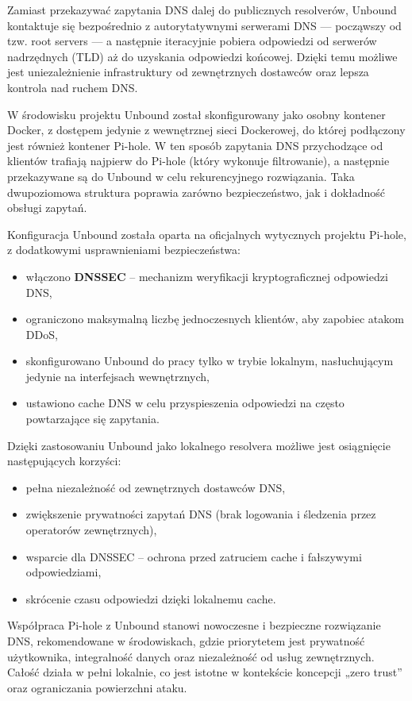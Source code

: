 \documentclass[
    left=2.5cm,         %
    right=2.5cm,        %
    top=2.5cm,          %
    bottom=3cm,         %
    bindingoffset=6mm,  %
    nohyphenation=true %
]{eiti/eiti-thesis} %
\begin{document}
Zamiast przekazywać zapytania DNS dalej do publicznych resolverów, Unbound kontaktuje się bezpośrednio z autorytatywnymi serwerami DNS — począwszy od tzw. root servers — a następnie iteracyjnie pobiera odpowiedzi od serwerów nadrzędnych (TLD) aż do uzyskania odpowiedzi końcowej. Dzięki temu możliwe jest uniezależnienie infrastruktury od zewnętrznych dostawców oraz lepsza kontrola nad ruchem DNS.

W środowisku projektu Unbound został skonfigurowany jako osobny kontener Docker, z dostępem jedynie z wewnętrznej sieci Dockerowej, do której podłączony jest również kontener Pi-hole\cite{config-unbound}. W ten sposób zapytania DNS przychodzące od klientów trafiają najpierw do Pi-hole (który wykonuje filtrowanie), a następnie przekazywane są do Unbound w celu rekurencyjnego rozwiązania. Taka dwupoziomowa struktura poprawia zarówno bezpieczeństwo, jak i dokładność obsługi zapytań.

Konfiguracja Unbound została oparta na oficjalnych wytycznych projektu Pi-hole, z dodatkowymi usprawnieniami bezpieczeństwa:
\begin{itemize}
    \item włączono \textbf{DNSSEC} – mechanizm weryfikacji kryptograficznej odpowiedzi DNS,
    \item ograniczono maksymalną liczbę jednoczesnych klientów, aby zapobiec atakom DDoS,
    \item skonfigurowano Unbound do pracy tylko w trybie lokalnym, nasłuchującym jedynie na interfejsach wewnętrznych,
    \item ustawiono cache DNS w celu przyspieszenia odpowiedzi na często powtarzające się zapytania.
\end{itemize}

Dzięki zastosowaniu Unbound jako lokalnego resolvera możliwe jest osiągnięcie następujących korzyści:
\begin{itemize}
    \item pełna niezależność od zewnętrznych dostawców DNS,
    \item zwiększenie prywatności zapytań DNS (brak logowania i śledzenia przez operatorów zewnętrznych),
    \item wsparcie dla DNSSEC – ochrona przed zatruciem cache i fałszywymi odpowiedziami,
    \item skrócenie czasu odpowiedzi dzięki lokalnemu cache.
\end{itemize}

Współpraca Pi-hole z Unbound stanowi nowoczesne i bezpieczne rozwiązanie DNS, rekomendowane w środowiskach, gdzie priorytetem jest prywatność użytkownika, integralność danych oraz niezależność od usług zewnętrznych. Całość działa w pełni lokalnie, co jest istotne w kontekście koncepcji „zero trust” oraz ograniczania powierzchni ataku.
\end{document}
